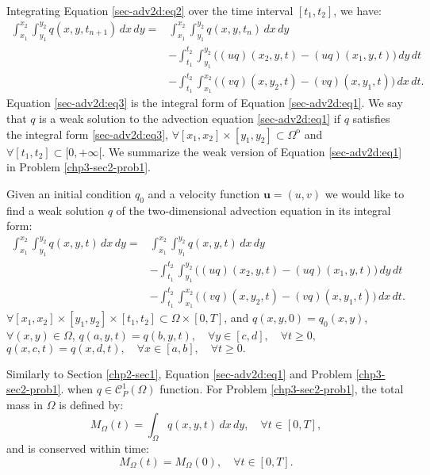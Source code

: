 Integrating Equation \eqref{sec-adv2d:eq2} over the time interval $[t_1,t_2]$, 
we have:
\begin{align}
	\label{sec-adv2d:eq3}
	\int_{x_1}^{x_2} \int_{y_1}^{y_2}
	{q}(x, y, t_{n+1}) \,dx \,dy = &\int_{x_1}^{x_2} \int_{y_1}^{y_2}
	{q}(x, y, t_n) \,dx \,dy \\ \nonumber
	&-\int_{t_1}^{t_2} \int_{y_1}^{y_2} \bigg({(uq)}(x_2, y, t)
	-{(uq)}(x_1, y, t) \bigg) \,dy \,dt\\ \nonumber
	&-\int_{t_1}^{t_2} \int_{x_1}^{x_2} \bigg({(vq)}(x, y_2, t)
	-{(vq)}(x, y_1, t) \bigg) \,dx \,dt.
\end{align}
Equation \eqref{sec-adv2d:eq3} is the integral form of Equation 
\eqref{sec-adv2d:eq1}. We say that ${q}$ is a weak
solution to the advection equation \eqref{sec-adv2d:eq1} if ${q}$
satisfies the integral form \eqref{sec-adv2d:eq3}, 
$\forall [x_1,x_2]\times[y_1,y_2] \subset \Omega^{\mathrm{o}}$ and 
$\forall [t_1,t_2] \subset [0,+\infty[$.
We summarize the weak version of Equation \eqref{sec-adv2d:eq1} in Problem \eqref{chp3-sec2-prob1}.
\begin{prob}
	\label{chp3-sec2-prob1}
	Given an initial condition ${q}_0$ and
	a velocity function $\boldsymbol{u} = (u,v)$
 	we would like to find a weak solution ${q}$
	of the two-dimensional advection equation in its integral form:
	\begin{align*}
		\int_{x_1}^{x_2} \int_{y_1}^{y_2}
		{q}(x, y, t) \,dx \,dy = &\int_{x_1}^{x_2} \int_{y_1}^{y_2}
		{q}(x, y, t) \,dx \,dy \\ \nonumber
		&-\int_{t_1}^{t_2} \int_{y_1}^{y_2} \bigg({(uq)}(x_2, y, t)
		-{(uq)}(x_1, y, t) \bigg) \,dy \,dt\\ \nonumber
		&-\int_{t_1}^{t_2} \int_{x_1}^{x_2} \bigg({(vq)}(x, y_2, t)
		-{(vq)}(x, y_1, t) \bigg) \,dx \,dt.
	\end{align*}
	$\forall [x_1, x_2]\times [y_1, y_2] \times[t_1, t_2] \subset \Omega \times[0,T]$, 
	and ${q}(x, y, 0) = {q}_0(x, y)$, $\forall (x, y) \in \Omega$,
   ${q}(a, y, t) = {q}(b, y, t), \quad \forall y \in [c,d],  \quad \forall t\geq 0,$
   ${q}(x, c, t) = {q}(x, d, t), \quad \forall x \in [a,b],  \quad \forall t\geq 0.$
\end{prob}
Similarly to Section \ref{chp2-sec1}, Equation \eqref{sec-adv2d:eq1} and Problem \eqref{chp3-sec2-prob1}.
when ${q} \in \mathcal{C}^1_P{(\Omega)}$ function.
For Problem \ref{chp3-sec2-prob1}, the total mass in $\Omega$ is defined by: 
\begin{equation}
	{M}_{\Omega}(t) = \int_{\Omega} {q}(x,y,t) \,dx \,dy , \quad \forall t \in [0,T],
\end{equation}
and is conserved within time: 
\begin{equation}
	{M}_{\Omega}(t) = {M}_{\Omega}(0), \quad \forall t \in [0,T].
\end{equation}

